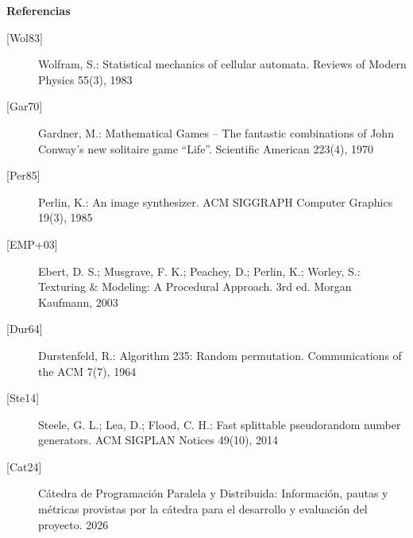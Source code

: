 \documentclass[10pt,a4paper]{article}
\begin{document}
\vspace{1cm}
\noindent \textbf{\fontsize{14}{17}\selectfont Referencias}
\begin{description}
    \item[{[Wol83]}] Wolfram, S.: Statistical mechanics of cellular automata. Reviews of Modern Physics 55(3), 1983
    \item[{[Gar70]}] Gardner, M.: Mathematical Games -- The fantastic combinations of John Conway's new solitaire game ``Life''. Scientific American 223(4), 1970
    \item[{[Per85]}] Perlin, K.: An image synthesizer. ACM SIGGRAPH Computer Graphics 19(3), 1985
    \item[{[EMP+03]}] Ebert, D. S.; Musgrave, F. K.; Peachey, D.; Perlin, K.; Worley, S.: Texturing \& Modeling: A Procedural Approach. 3rd ed. Morgan Kaufmann, 2003
    \item[{[Dur64]}] Durstenfeld, R.: Algorithm 235: Random permutation. Communications of the ACM 7(7), 1964
    \item[{[Ste14]}] Steele, G. L.; Lea, D.; Flood, C. H.: Fast splittable pseudorandom number generators. ACM SIGPLAN Notices 49(10), 2014
    \item[{[Cat24]}] Cátedra de Programación Paralela y Distribuida: Información, pautas y métricas provistas por la cátedra para el desarrollo y evaluación del proyecto. 2026
\end{description}
\end{document}

